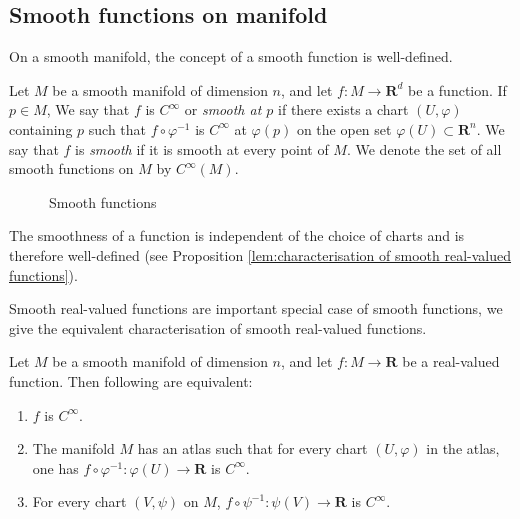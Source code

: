 \subsection{Smooth functions on manifold}
On a smooth manifold, the concept of a smooth function is well-defined.
\begin{definition}
    Let $M$ be a smooth manifold of dimension $n$, and let $f : M \to \mathbf{R}^d$ be a function. If $p \in M$, We say that $f$ is $C^\infty$ or \emph{smooth at $p$} if there exists a chart $(U, \varphi)$ containing $p$ such that $f \circ \varphi^{-1}$ is $C^\infty$ at $\varphi(p)$ on the open set $\varphi(U) \subset \mathbf{R}^n$. We say that $f$ is \emph{smooth} if it is smooth at every point of $M$. We denote the set of all smooth functions on $M$ by $C^\infty(M)$.
\end{definition}

\begin{figure}[h]
    \centering
    
    \caption{Smooth functions}
\end{figure}

\begin{remark}
    The smoothness of a function is independent of the choice of charts and is therefore well-defined (see Proposition \ref{lem:characterisation of smooth real-valued functions}).
\end{remark}

Smooth real-valued functions are important special case of smooth functions, we give the equivalent characterisation of smooth real-valued functions.

\begin{proposition}\label{lem:characterisation of smooth real-valued functions}
    Let $M$ be a smooth manifold of dimension $n$, and let $f : M \to \mathbf{R}$ be a real-valued function. Then following are equivalent:
    \begin{enumerate}
        \item $f$ is $C^\infty$.
        \item The manifold $M$ has an atlas such that for every chart $(U, \varphi)$ in the atlas, one has $f \circ \varphi^{-1} : \varphi(U) \to \mathbf{R}$ is $C^\infty$.
        \item For every chart $(V, \psi)$ on $M$, $f \circ \psi^{-1} : \psi(V) \to \mathbf{R}$ is $C^\infty$.
    \end{enumerate}
\end{proposition}


